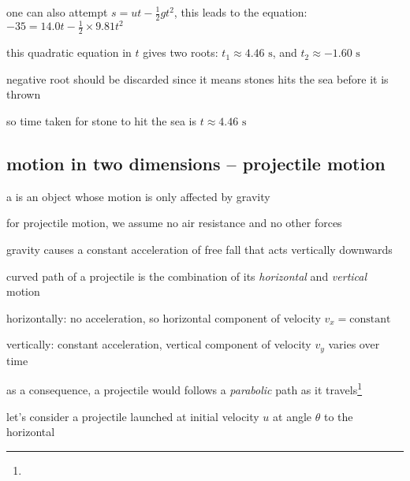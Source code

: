 one can also attempt $s = ut - \frac{1}{2}gt^2$, this leads to the equation: $-35 = 14.0t - \frac{1}{2}\times9.81t^2$

this quadratic equation in $t$ gives two roots: $t_1 \approx 4.46 \text{ s}$, and $t_2 \approx -1.60 \text{ s}$

negative root should be discarded since it means stones hits the sea before it is thrown

so time taken for stone to hit the sea is $t \approx 4.46\text{ s}$ \eoe





\subsection{motion in two dimensions -- projectile motion}\label{ch:projectile}

a  is an object whose motion is only affected by gravity

for projectile motion, we assume no air resistance and no other forces

gravity causes a constant acceleration of free fall that acts vertically downwards

\cmt curved path of a projectile is the combination of its \emph{horizontal} and \emph{vertical} motion

\titem horizontally: no acceleration, so horizontal component of velocity $v_x = \text{constant}$

\titem vertically: constant acceleration, vertical component of velocity $v_y$ varies over time

as a consequence, a projectile would follows a \emph{parabolic} path as it travels\footnote{}


\vspace*{\baselineskip}

let's consider a projectile launched at initial velocity $u$ at angle $\theta$ to the horizontal

